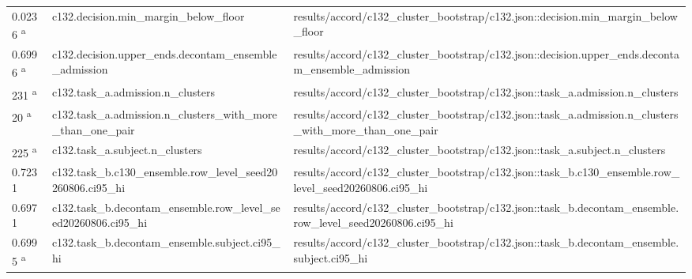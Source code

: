 \begin{longtable}{@{}p{0.7in}p{1.9in}p{2.6in}@{}}
0.0236 \textsuperscript{a} & c132.\allowbreak{}decision.\allowbreak{}min\_margin\_below\_floor & results/\allowbreak{}accord/\allowbreak{}c132\_cluster\_bootstrap/\allowbreak{}c132.\allowbreak{}json::decision.\allowbreak{}min\_margin\_below\_floor\\
0.6996 \textsuperscript{a} & c132.\allowbreak{}decision.\allowbreak{}upper\_ends.\allowbreak{}decontam\_ensemble\_admission & results/\allowbreak{}accord/\allowbreak{}c132\_cluster\_bootstrap/\allowbreak{}c132.\allowbreak{}json::decision.\allowbreak{}upper\_ends.\allowbreak{}decontam\_ensemble\_admission\\
231 \textsuperscript{a} & c132.\allowbreak{}task\_a.\allowbreak{}admission.\allowbreak{}n\_clusters & results/\allowbreak{}accord/\allowbreak{}c132\_cluster\_bootstrap/\allowbreak{}c132.\allowbreak{}json::task\_a.\allowbreak{}admission.\allowbreak{}n\_clusters\\
20 \textsuperscript{a} & c132.\allowbreak{}task\_a.\allowbreak{}admission.\allowbreak{}n\_clusters\_with\_more\_than\_one\_pair & results/\allowbreak{}accord/\allowbreak{}c132\_cluster\_bootstrap/\allowbreak{}c132.\allowbreak{}json::task\_a.\allowbreak{}admission.\allowbreak{}n\_clusters\_with\_more\_than\_one\_pair\\
225 \textsuperscript{a} & c132.\allowbreak{}task\_a.\allowbreak{}subject.\allowbreak{}n\_clusters & results/\allowbreak{}accord/\allowbreak{}c132\_cluster\_bootstrap/\allowbreak{}c132.\allowbreak{}json::task\_a.\allowbreak{}subject.\allowbreak{}n\_clusters\\
0.7231 & c132.\allowbreak{}task\_b.\allowbreak{}c130\_ensemble.\allowbreak{}row\_level\_seed20260806.\allowbreak{}ci95\_hi & results/\allowbreak{}accord/\allowbreak{}c132\_cluster\_bootstrap/\allowbreak{}c132.\allowbreak{}json::task\_b.\allowbreak{}c130\_ensemble.\allowbreak{}row\_level\_seed20260806.\allowbreak{}ci95\_hi\\
0.6971 & c132.\allowbreak{}task\_b.\allowbreak{}decontam\_ensemble.\allowbreak{}row\_level\_seed20260806.\allowbreak{}ci95\_hi & results/\allowbreak{}accord/\allowbreak{}c132\_cluster\_bootstrap/\allowbreak{}c132.\allowbreak{}json::task\_b.\allowbreak{}decontam\_ensemble.\allowbreak{}row\_level\_seed20260806.\allowbreak{}ci95\_hi\\
0.6995 \textsuperscript{a} & c132.\allowbreak{}task\_b.\allowbreak{}decontam\_ensemble.\allowbreak{}subject.\allowbreak{}ci95\_hi & results/\allowbreak{}accord/\allowbreak{}c132\_cluster\_bootstrap/\allowbreak{}c132.\allowbreak{}json::task\_b.\allowbreak{}decontam\_ensemble.\allowbreak{}subject.\allowbreak{}ci95\_hi\\

\end{longtable}
